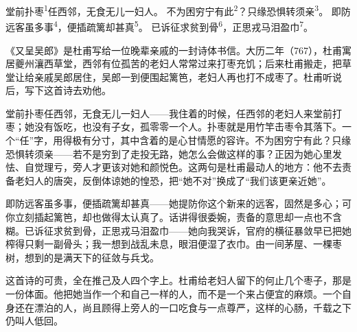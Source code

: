 
\begin{poem}
堂前扑枣\textsuperscript{1}任西邻，无食无儿一妇人。
不为困穷宁有此\textsuperscript{2}？只缘恐惧转须亲\textsuperscript{3}。
即防远客虽多事\textsuperscript{4}，便插疏篱却甚真\textsuperscript{5}。
已诉征求贫到骨\textsuperscript{6}，正思戎马泪盈巾\textsuperscript{7}。
\end{poem}

\begin{annotations}
\end{annotations}

\begin{appreciation}
《又呈吴郎》是杜甫写给一位晚辈亲戚的一封诗体书信。大历二年（767），杜甫寓居夔州瀼西草堂，西邻有位孤苦的老妇人常常过来打枣充饥；后来杜甫搬走，把草堂让给亲戚吴郎居住，吴郎一到便围起篱笆，老妇人再也打不成枣了。杜甫听说后，写下这首诗去劝他。

堂前扑枣任西邻，无食无儿一妇人——我住着的时候，任西邻的老妇人来堂前打枣；她没有饭吃，也没有子女，孤零零一个人。扑枣就是用竹竿击枣令其落下。一个“任”字，用得极有分寸，其中含着的是心甘情愿的容许。不为困穷宁有此？只缘恐惧转须亲——若不是穷到了走投无路，她怎么会做这样的事？正因为她心里发怯、自觉理亏，旁人才更该对她和颜悦色。这两句是杜甫最动人的地方：他不去责备老妇人的唐突，反倒体谅她的惶恐，把“她不对”换成了“我们该更亲近她”。

即防远客虽多事，便插疏篱却甚真——她提防你这个新来的远客，固然是多心；可你立刻插起篱笆，却也做得太认真了。话讲得很委婉，责备的意思却一点也不含糊。已诉征求贫到骨，正思戎马泪盈巾——她向我哭诉，官府的横征暴敛早已把她榨得只剩一副骨头；我一想到战乱未息，眼泪便湿了衣巾。由一间茅屋、一棵枣树，想到的是满天下的征敛与兵戈。

这首诗的可贵，全在推己及人四个字上。杜甫给老妇人留下的何止几个枣子，那是一份体面。他把她当作一个和自己一样的人，而不是一个来占便宜的麻烦。一个自身还在漂泊的人，尚且顾得上旁人的一口吃食与一点尊严，这样的心肠，千载之下仍叫人低回。
\end{appreciation}
